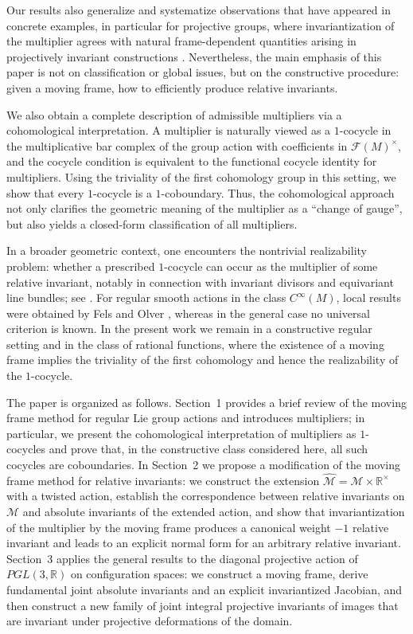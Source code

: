 \documentclass[12pt,reqno]{amsart}
\begin{document}
Our results also generalize and systematize observations that have appeared in concrete examples, in particular
for projective groups, where invariantization of the multiplier agrees with natural frame-dependent quantities
arising in projectively invariant constructions \cite{B-2025, B-2025-1}. Nevertheless, the main emphasis of this
paper is not on classification or global issues, but on the constructive procedure: given a moving frame, how to
efficiently produce relative invariants.

We also obtain a complete description of admissible multipliers via a cohomological interpretation. A multiplier
is naturally viewed as a $1$-cocycle in the multiplicative bar complex of the group action with coefficients in
$\mathcal F(M)^\times$, and the cocycle condition is equivalent to the functional cocycle identity for
multipliers. Using the triviality of the first cohomology group in this setting, we show that every $1$-cocycle is
a $1$-coboundary. Thus, the cohomological approach not only clarifies the geometric meaning of the multiplier as a
``change of gauge'', but also yields a closed-form classification of all multipliers.

\medskip
In a broader geometric context, one encounters the nontrivial {realizability} problem: whether a prescribed
$1$-cocycle can occur as the multiplier of some relative invariant, notably in connection with invariant divisors
and equivariant line bundles; see \cite{Krug}. For regular smooth actions in the class $C^\infty(M)$, local results
were obtained by Fels and Olver \cite{Olver1997}, whereas in the general case no universal criterion is known.
In the present work we remain in a constructive regular setting and in the class of rational functions, where the
existence of a moving frame implies the triviality of the first cohomology and hence the realizability of the
$1$-cocycle.

The paper is organized as follows. Section~1 provides a brief review of the moving frame method for regular Lie
group actions and introduces multipliers; in particular, we present the cohomological interpretation of
multipliers as $1$-cocycles and prove that, in the constructive class considered here, all such cocycles are
coboundaries. In Section~2 we propose a modification of the moving frame method for relative invariants: we
construct the extension $\widehat{\mathcal M}=\mathcal M\times\mathbb R^\times$ with a twisted action, establish
the correspondence between relative invariants on $\mathcal M$ and absolute invariants of the extended action, and
show that invariantization of the multiplier by the moving frame produces a canonical weight $-1$ relative
invariant and leads to an explicit normal form for an arbitrary relative invariant. Section~3 applies the general
results to the diagonal projective action of $PGL(3,\mathbb R)$ on configuration spaces: we construct a moving
frame, derive fundamental joint absolute invariants and an explicit invariantized Jacobian, and then construct a
new family of joint integral projective invariants of images that are invariant under projective deformations of
the domain.
\end{document}
